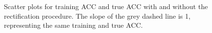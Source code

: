 \documentclass[12pt]{article}
\begin{document}
		\begin{figure}[htpb]
			\centering
			\caption{Scatter plots for training ACC and true ACC with and without the rectification procedure. The slope of the grey dashed line is 1, representing the same training and true ACC.}
			\label{fig:acc_scatter_w_wo_swap_label}
		\end{figure}
\end{document}
